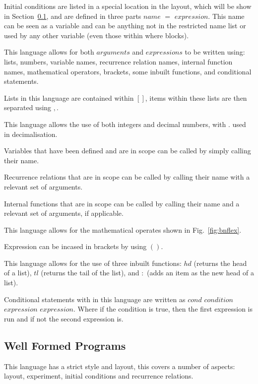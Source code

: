 \documentclass{article}
\begin{document}
Initial conditions are listed in a special location in the layout, which will be show in Section~\ref{wellformedprogs}, and are defined in three parts $name$ $=$ $expression$. This name can be seen as a variable and can be anything not in the restricted name list or used by any other variable (even those within where blocks). 

This language allows for both $arguments$ and $expressions$ to be written using: lists, numbers, variable names, recurrence relation names, internal function names, mathematical operators, brackets, some inbuilt functions, and conditional statements. 

Lists in this language are contained within $[]$, items within these lists are then separated using $,$.  

This language allows the use of both integers and decimal numbers, with $.$ used in decimalisation. 

Variables that have been defined and are in scope can be called by simply calling their name. 

Recurrence relations that are in scope can be called by calling their name with a relevant set of arguments.  

Internal functions that are in scope can be called by calling their name and a relevant set of arguments, if applicable. 

This language allows for the mathematical operates shown in Fig.~\ref{fig:bnflex}.

Expression can be incased in brackets by using $()$.

This language allows for the use of three inbuilt functions: $hd$ (returns the head of a list), $tl$ (returns the tail of the list), and $:$ (adds an item as the new head of a list).  

Conditional statements with in this language are written as $cond$ $condition$ $expression$ $expression$. Where if the condition is true, then the first expression is run and if not the second expression is.  


\subsection{Well Formed Programs} \label{wellformedprogs} 
This language has a strict style and layout, this covers a number of aspects: layout, experiment, initial conditions and recurrence relations.  

%	
\end{document}
